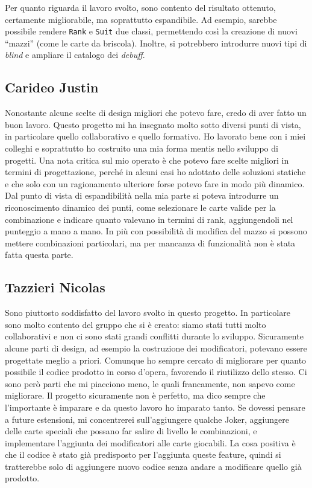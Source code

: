 \documentclass[a4paper,12pt]{report}
\begin{document}
Per quanto riguarda il lavoro svolto, sono contento del risultato ottenuto, certamente migliorabile, ma soprattutto espandibile. Ad esempio, sarebbe possibile rendere \texttt{Rank} e \texttt{Suit} due classi, permettendo così la creazione di nuovi “mazzi” (come le carte da briscola). Inoltre, si potrebbero introdurre nuovi tipi di \textit{blind} e ampliare il catalogo dei \textit{debuff}.

\subsection{Carideo Justin}
Nonostante alcune scelte di design migliori che potevo fare, credo di aver fatto un buon lavoro.
Questo progetto mi ha insegnato molto sotto diversi punti di vista, in particolare quello collaborativo
e quello formativo. Ho lavorato bene con i miei colleghi e soprattutto ho costruito una mia forma mentis
nello sviluppo di progetti. Una nota critica sul mio operato è che potevo fare scelte migliori in termini
di progettazione, perché in alcuni casi ho adottato delle soluzioni statiche e che solo con un ragionamento
ulteriore forse potevo fare in modo più dinamico.
Dal punto di vista di espandibilità nella mia parte si poteva introdurre un riconoscimento dinamico dei punti, 
come selezionare le carte valide per la combinazione e indicare quanto valevano in termini di rank, aggiungendoli 
nel punteggio a mano a mano. In più con possibilità di modifica del mazzo si possono mettere combinazioni 
particolari, ma per mancanza di funzionalità non è stata fatta questa parte. 

\subsection{Tazzieri Nicolas}
Sono piuttosto soddisfatto del lavoro svolto in questo progetto. In particolare sono molto contento del gruppo che si è creato: siamo stati tutti molto collaborativi e non ci sono stati grandi conflitti durante lo sviluppo. Sicuramente alcune parti di design, ad esempio la costruzione dei modificatori, potevano essere progettate meglio a priori. Comunque ho sempre cercato di migliorare per quanto possibile il codice prodotto in corso d’opera, favorendo il riutilizzo dello stesso. Ci sono però parti che mi piacciono meno, le quali francamente, non sapevo come migliorare. Il progetto sicuramente non è perfetto, ma dico sempre che l’importante è imparare e da questo lavoro ho imparato tanto. Se dovessi pensare a future estensioni, mi concentrerei sull’aggiungere qualche Joker, aggiungere delle carte speciali che possano far salire di livello le combinazioni, e implementare l’aggiunta dei modificatori alle carte giocabili. La cosa positiva è che il codice è stato già predisposto per l'aggiunta queste feature, quindi si tratterebbe solo di aggiungere nuovo codice senza andare a modificare quello già prodotto.
\end{document}
